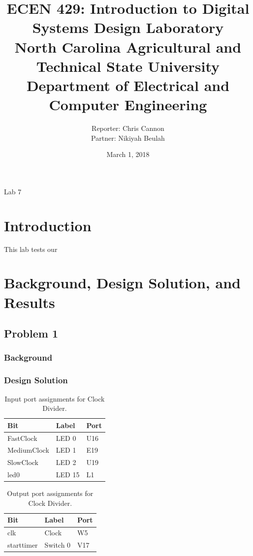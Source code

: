 \documentclass[11pt]{article}
\title {{\titleFont ECEN 429: Introduction to Digital Systems Design Laboratory \\ North Carolina Agricultural and Technical State University \\ Department of Electrical and Computer Engineering}} %
\author{\titleFont Reporter: Chris Cannon\\ \titleFont Partner: Nikiyah Beulah} %
\date{\titleFont March 1, 2018}
\begin{document}
\begin{titlingpage}
\maketitle
\begin{center}
	Lab 7
\end{center}
\end{titlingpage}

\section{Introduction}
This lab tests our 

\section{Background, Design Solution, and Results}

\subsection{Problem 1 }

\subsubsection{Background}


\subsubsection{Design Solution}


\begin{table}[H]
\begin{center}
\begin{tabular}{| l | l | l |}
	\hline
	Bit & Label & Port \\ \hline
	FastClock & LED 0 & U16 \\ \hline
	MediumClock & LED 1 & E19 \\ \hline
	SlowClock & LED 2 & U19 \\ \hline
	led0 & LED 15 & L1 \\ \hline
\end{tabular}
\caption{\label{tab:clockDivider_input_Ports}Input port assignments for Clock Divider.}
\end{center}
\end{table}

\begin{table}[H]
\begin{center}
\begin{tabular}{| l | l | l |}
	\hline
	Bit & Label & Port \\ \hline
	clk & Clock & W5 \\ \hline
	starttimer & Switch 0 & V17 \\ \hline
\end{tabular}
\caption{\label{tab:clockDivider_output_Ports}Output port assignments for Clock Divider.}
\end{center}
\end{table}
\end{document}
